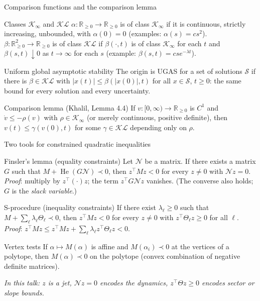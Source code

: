 \documentclass[10pt,aspectratio=169]{beamer}
\newcommand{\R}{\mathbb{R}}
\newcommand{\tr}{^{\top}}
\newcommand{\NN}{\mathcal{N}}
\newcommand{\Sol}{\mathcal{S}}
\DeclareMathOperator{\He}{He}
\begin{document}
\begin{frame}{Comparison functions and the comparison lemma}
\begin{block}{Classes $\mathcal K_\infty$ and $\mathcal{KL}$}
$\alpha:\R_{\ge0}\to\R_{\ge0}$ is of class $\mathcal K_\infty$ if it is continuous, strictly increasing, unbounded, with $\alpha(0)=0$ (examples: $\alpha(s)=cs^2$). \\
$\beta:\R_{\ge0}^2\to\R_{\ge0}$ is of class $\mathcal{KL}$ if $\beta(\cdot,t)$ is of class $\mathcal K_\infty$ for each $t$ and $\beta(s,t)\downarrow0$ as $t\to\infty$ for each $s$ (example: $\beta(s,t)=cse^{-\lambda t}$).
\end{block}
\begin{block}{Uniform global asymptotic stability}
The origin is UGAS for a set of solutions $\Sol$ if there is $\beta\in\mathcal{KL}$ with $|x(t)|\le\beta(|x(0)|,t)$ for all $x\in\Sol$, $t\ge0$: the same bound for every solution and every uncertainty.
\end{block}
\begin{block}{Comparison lemma (Khalil, Lemma 4.4)}
If $v:[0,\infty)\to\R_{\ge0}$ is $C^1$ and $\dot v\le-\rho(v)$ with $\rho\in\mathcal K_\infty$ (or merely continuous, positive definite), then $v(t)\le\gamma(v(0),t)$ for some $\gamma\in\mathcal{KL}$ depending only on $\rho$.
\end{block}
\end{frame}

\begin{frame}{Two tools for constrained quadratic inequalities}
\begin{block}{Finsler's lemma (equality constraints)}
Let $\NN$ be a matrix. If there exists a matrix $G$ such that $M+\He(G\NN)\prec0$, then $z\tr Mz<0$ for every $z\ne0$ with $\NN z=0$.\\
\emph{Proof}: multiply by $z\tr(\cdot)z$; the term $z\tr G\NN z$ vanishes. (The converse also holds; $G$ is the \emph{slack variable}.)
\end{block}
\begin{block}{S-procedure (inequality constraints)}
If there exist $\lambda_\ell\ge0$ such that $M+\sum_\ell\lambda_\ell\Theta_\ell\prec0$, then $z\tr Mz<0$ for every $z\ne0$ with $z\tr\Theta_\ell z\ge0$ for all $\ell$.\\
\emph{Proof}: $z\tr Mz\le z\tr Mz+\sum_\ell\lambda_\ell z\tr\Theta_\ell z<0$.
\end{block}
\begin{block}{Vertex tests}
If $\alpha\mapsto M(\alpha)$ is affine and $M(\alpha_i)\prec0$ at the vertices of a polytope, then $M(\alpha)\prec0$ on the polytope (convex combination of negative definite matrices).
\end{block}
\medskip
\centering\emph{In this talk: $z$ is a jet, $\NN z=0$ encodes the dynamics, $z\tr\Theta z\ge0$ encodes sector or slope bounds.}
\end{frame}
\end{document}
